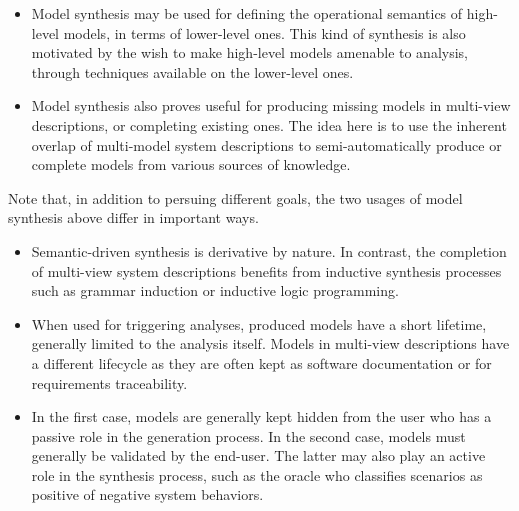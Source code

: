 \begin{itemize}

\item Model synthesis may be used for defining the operational semantics of high-level models, in terms of lower-level ones. This kind of synthesis is also motivated by the wish to make high-level models amenable to analysis, through techniques available on the lower-level ones.


\item Model synthesis also proves useful for producing missing models in multi-view descriptions, or completing existing ones. The idea here is to use the inherent overlap of multi-model system descriptions to semi-automatically produce or complete models from various sources of knowledge.


\end{itemize}

Note that, in addition to persuing different goals, the two usages of model synthesis above differ in important ways.

\begin{itemize}

\item Semantic-driven synthesis is derivative by nature. In contrast, the completion of multi-view system descriptions benefits from inductive synthesis processes such as grammar induction or inductive logic programming.

\item When used for triggering analyses, produced models have a short lifetime, generally limited to the analysis itself. Models in multi-view descriptions have a different lifecycle as they are often kept as software documentation or for requirements traceability. 

\item In the first case, models are generally kept hidden from the user who has a passive role in the generation process. In the second case, models must generally be validated by the end-user. The latter may also play an active role in the synthesis process, such as the oracle who classifies scenarios as positive of negative system behaviors.

\end{itemize}

